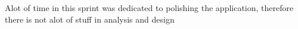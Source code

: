 Alot of time in this sprint was dedicated to polishing the application, therefore there is not alot of stuff in analysis and design



